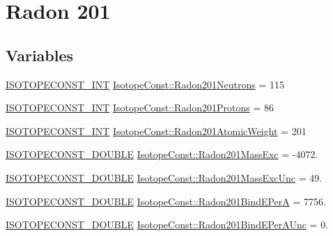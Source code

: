 \hypertarget{group___isotope_const-_radon-_rn201}{}\section{Radon 201}
\label{group___isotope_const-_radon-_rn201}
\subsection*{Variables}
\begin{DoxyCompactItemize}
\item 
\mbox{\hyperlink{group___isotope_const-_macros_ga5f18360b3e99483a35c32d789e62621c}{I\+S\+O\+T\+O\+P\+E\+C\+O\+N\+S\+T\+\_\+\+I\+NT}} \mbox{\hyperlink{group___isotope_const-_radon-_rn201_ga7070e28864d1477187068aae00c2a3e0}{Isotope\+Const\+::\+Radon201\+Neutrons}} = 115
\item 
\mbox{\hyperlink{group___isotope_const-_macros_ga5f18360b3e99483a35c32d789e62621c}{I\+S\+O\+T\+O\+P\+E\+C\+O\+N\+S\+T\+\_\+\+I\+NT}} \mbox{\hyperlink{group___isotope_const-_radon-_rn201_gac9f96e6a338906eed82b80f381397d88}{Isotope\+Const\+::\+Radon201\+Protons}} = 86
\item 
\mbox{\hyperlink{group___isotope_const-_macros_ga5f18360b3e99483a35c32d789e62621c}{I\+S\+O\+T\+O\+P\+E\+C\+O\+N\+S\+T\+\_\+\+I\+NT}} \mbox{\hyperlink{group___isotope_const-_radon-_rn201_gaaece13a99d34e2d724ffe595dbc305bb}{Isotope\+Const\+::\+Radon201\+Atomic\+Weight}} = 201
\item 
\mbox{\hyperlink{group___isotope_const-_macros_ga8f45a7272ce02c0b4c65c44636ed719a}{I\+S\+O\+T\+O\+P\+E\+C\+O\+N\+S\+T\+\_\+\+D\+O\+U\+B\+LE}} \mbox{\hyperlink{group___isotope_const-_radon-_rn201_ga9b3b085def459dda2ad5805a746bce9a}{Isotope\+Const\+::\+Radon201\+Mass\+Exc}} = -\/4072.
\item 
\mbox{\hyperlink{group___isotope_const-_macros_ga8f45a7272ce02c0b4c65c44636ed719a}{I\+S\+O\+T\+O\+P\+E\+C\+O\+N\+S\+T\+\_\+\+D\+O\+U\+B\+LE}} \mbox{\hyperlink{group___isotope_const-_radon-_rn201_gad93b12a0e0ef6f288e8082a0f871b526}{Isotope\+Const\+::\+Radon201\+Mass\+Exc\+Unc}} = 49.
\item 
\mbox{\hyperlink{group___isotope_const-_macros_ga8f45a7272ce02c0b4c65c44636ed719a}{I\+S\+O\+T\+O\+P\+E\+C\+O\+N\+S\+T\+\_\+\+D\+O\+U\+B\+LE}} \mbox{\hyperlink{group___isotope_const-_radon-_rn201_gad0d755e20f09f3078439bc1e324f72b6}{Isotope\+Const\+::\+Radon201\+Bind\+E\+PerA}} = 7756.
\item 
\mbox{\hyperlink{group___isotope_const-_macros_ga8f45a7272ce02c0b4c65c44636ed719a}{I\+S\+O\+T\+O\+P\+E\+C\+O\+N\+S\+T\+\_\+\+D\+O\+U\+B\+LE}} \mbox{\hyperlink{group___isotope_const-_radon-_rn201_ga64e6d4c260d751f70d430364d7210352}{Isotope\+Const\+::\+Radon201\+Bind\+E\+Per\+A\+Unc}} = 0.

\end{DoxyCompactItemize}
